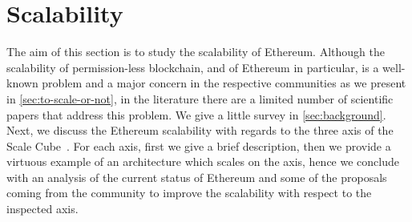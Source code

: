 \section{Scalability}
\label{sec:scalability}

The aim of this section is to study the scalability of Ethereum. Although the
scalability of permission-less blockchain, and of Ethereum in particular, is a
well-known problem and a major concern in the respective communities as we
present in \autoref{sec:to-scale-or-not}, in the literature there are a limited
number of scientific papers that address this problem. We give a little survey
in \autoref{sec:background}. Next, we discuss the Ethereum scalability with
regards to the three axis of the Scale Cube~\cite{bib:art-of-scalability}. For
each axis, first we give a brief description, then we provide a virtuous example
of an architecture which scales on the axis, hence we conclude with an analysis
of the current status of Ethereum and some of the proposals coming from the
community to improve the scalability with respect to the inspected axis.
